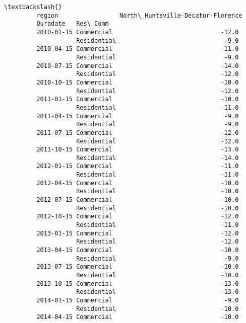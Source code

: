 \documentclass[11pt]{article}
\begin{document}
\begin{Verbatim}[commandchars=\\\{\}]
                                                                   \textbackslash{}
         region                 North\_Huntsville-Decatur-Florence   
         Quradate   Res\_Comm                                        
         2010-01-15 Commercial                              -12.0   
                    Residential                              -9.0   
         2010-04-15 Commercial                              -11.0   
                    Residential                              -9.0   
         2010-07-15 Commercial                              -14.0   
                    Residential                             -12.0   
         2010-10-15 Commercial                              -10.0   
                    Residential                             -12.0   
         2011-01-15 Commercial                              -10.0   
                    Residential                             -11.0   
         2011-04-15 Commercial                               -9.0   
                    Residential                              -9.0   
         2011-07-15 Commercial                              -12.0   
                    Residential                             -12.0   
         2011-10-15 Commercial                              -13.0   
                    Residential                             -14.0   
         2012-01-15 Commercial                              -11.0   
                    Residential                             -11.0   
         2012-04-15 Commercial                              -10.0   
                    Residential                             -10.0   
         2012-07-15 Commercial                              -10.0   
                    Residential                             -10.0   
         2012-10-15 Commercial                              -12.0   
                    Residential                             -11.0   
         2013-01-15 Commercial                              -12.0   
                    Residential                             -12.0   
         2013-04-15 Commercial                              -10.0   
                    Residential                              -9.0   
         2013-07-15 Commercial                              -10.0   
                    Residential                             -10.0   
         2013-10-15 Commercial                              -13.0   
                    Residential                             -13.0   
         2014-01-15 Commercial                               -9.0   
                    Residential                             -10.0   
         2014-04-15 Commercial                              -10.0   

\end{Verbatim}
\end{document}
